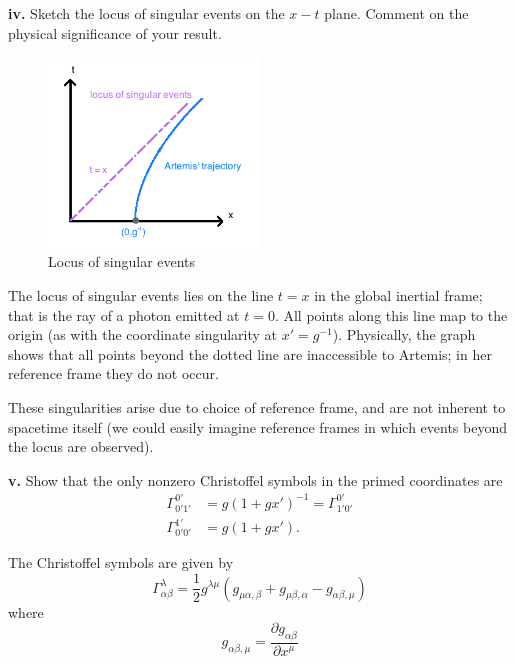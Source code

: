 \documentclass[a4paper]{article} %
\begin{document}
\begin{framed}
\textbf{iv.} Sketch the locus of singular events on the $x-t$ plane. Comment on the physical significance of your result.
\end{framed}

\begin{figure}[h]
\centering
\includegraphics[width=0.5\textwidth]{images/singularities.png}
\caption{Locus of singular events}
\label{singularities diagram}
\end{figure}

The locus of singular events lies on the line $t=x$ in the global inertial frame; that is the ray of a photon emitted at $t=0$. All points along this line map to the origin (as with the coordinate singularity at $x'=g^{-1}$). Physically, the graph shows that all points beyond the dotted line are inaccessible to Artemis; in her reference frame they do not occur.

These singularities arise due to choice of reference frame, and are not inherent to spacetime itself (we could easily imagine reference frames in which events beyond the locus are observed).


\begin{framed}
\textbf{v.} Show that the only nonzero Christoffel symbols in the primed coordinates are
\begin{align}
\Gamma^{0'}_{0'1'}&=g(1+gx')^{-1}=\Gamma^{0'}_{1'0'} \label{Chris 1}\\
\Gamma^{1'}_{0'0'}&=g(1+gx').\label{Chris 2}
\end{align}
\end{framed}

The Christoffel symbols are given by
\begin{equation}
\Gamma^{\lambda}_{\alpha\beta}=\frac{1}{2}g^{\lambda\mu}(g_{\mu\alpha,\beta}+g_{\mu\beta,\alpha}-g_{\alpha\beta,\mu})
\end{equation}
where
\begin{equation}
g_{\alpha\beta,\mu}=\frac{\partial g_{\alpha\beta}}{\partial x^{\mu}}
\end{equation}
\end{document}
